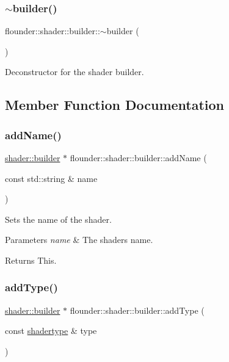 \subsubsection{\texorpdfstring{$\sim$builder()}{~builder()}}
{\footnotesize\ttfamily flounder\+::shader\+::builder\+::$\sim$builder (\begin{DoxyParamCaption}{ }\end{DoxyParamCaption})}



Deconstructor for the shader builder. 



\subsection{Member Function Documentation}
\mbox{\label{classflounder_1_1shader_1_1builder_adb72c6a3a95ee90a1ff8616af3f2ba99}} 
\subsubsection{\texorpdfstring{add\+Name()}{addName()}}
{\footnotesize\ttfamily \hyperlink{classflounder_1_1shader_1_1builder}{shader\+::builder} $\ast$ flounder\+::shader\+::builder\+::add\+Name (\begin{DoxyParamCaption}\item[{const std\+::string \&}]{name }\end{DoxyParamCaption})}



Sets the name of the shader. 


\begin{DoxyParams}{Parameters}
{\em name} & The shaders name. \\
\hline
\end{DoxyParams}
\begin{DoxyReturn}{Returns}
This. 
\end{DoxyReturn}
\mbox{\label{classflounder_1_1shader_1_1builder_ac994656b2088dc292ff04de8b24ebdcf}} 
\subsubsection{\texorpdfstring{add\+Type()}{addType()}}
{\footnotesize\ttfamily \hyperlink{classflounder_1_1shader_1_1builder}{shader\+::builder} $\ast$ flounder\+::shader\+::builder\+::add\+Type (\begin{DoxyParamCaption}\item[{const \hyperlink{classflounder_1_1shadertype}{shadertype} \&}]{type }\end{DoxyParamCaption})}



